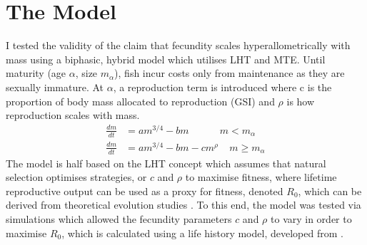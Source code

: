 \documentclass[a4paper]{article} %
\begin{document}
\section{The Model}\thispagestyle{empty}
I tested the validity of the claim that fecundity scales hyperallometrically with mass using a biphasic, hybrid model which utilises LHT and MTE. Until maturity (age $\alpha$, size $m_{\alpha}$), fish incur costs only from maintenance as they are sexually immature. At $\alpha$, a reproduction term is introduced where c is the proportion of body mass allocated to reproduction (GSI) and $\rho$ is how reproduction scales with mass.
\begin{align*}
    \frac{dm}{dt} &= am^{3/4} - bm \ \ \ \ \ \ \ \ \ \ \ \ \ \ m < m_{\alpha} \\
    \frac{dm}{dt} &= am^{3/4} - bm - cm^{\rho} \ \ \ \ \ m \geq m_{\alpha}
\end{align*}
The model is half based on the LHT concept which assumes that natural selection optimises strategies, or $c$ and $\rho$ to maximise fitness, where lifetime reproductive output can be used as a proxy for fitness, denoted $R_0$, which can be derived from theoretical evolution studies \autocite{Charnov2001, stearns1992evolution}. To this end, the model was tested via simulations which allowed the fecundity parameters $c$ and $\rho$ to vary in order to maximise $R_0$, which is calculated using a life history model, developed from \cite{Charnov2001}. 
\end{document}
